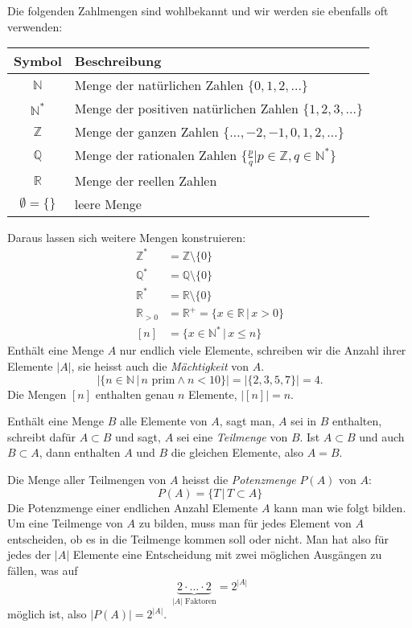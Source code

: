 Die folgenden Zahlmengen sind wohlbekannt und wir werden sie ebenfalls
oft verwenden:
\begin{center}
\begin{tabular}{|c|l|}
\hline
Symbol&Beschreibung\\
\hline
\index{natürliche Zahlen}%
$\mathbb N$&Menge der natürlichen Zahlen $\{0,1,2,\dots\}$\\
$\mathbb N^*$&Menge der positiven natürlichen Zahlen $\{1,2,3,\dots\}$\\
\index{ganze Zahlen}%
$\mathbb Z$&Menge der ganzen Zahlen $\{\dots,-2,-1,0,1,2,\dots\}$\\
\index{rationale Zahlen}%
$\mathbb Q$&Menge der rationalen Zahlen $\{\frac{p}{q}|p\in\mathbb Z,q\in\mathbb N^*\}$\\
\index{reelle Zahlen}%
$\mathbb R$&Menge der reellen Zahlen\\
\index{leere Menge}%
$\emptyset=\{\}$&leere Menge\\
\hline
\end{tabular}
\end{center}
Daraus lassen sich weitere Mengen konstruieren:
\begin{align*}
\mathbb Z^*&=\mathbb Z\setminus \{0\}\\
\mathbb Q^*&=\mathbb Q\setminus \{0\}\\
\mathbb R^*&=\mathbb R\setminus \{0\}\\
\mathbb R_{> 0}&=\mathbb R^+=\{x\in\mathbb R\,|\,x>0\}\\
[n]&=\{x\in \mathbb N^*\,|\,x\le n\}
\end{align*}
%
Enthält eine Menge $A$ nur endlich viele Elemente, schreiben wir die Anzahl
ihrer Elemente $|A|$, sie heisst auch die {\em Mächtigkeit} von $A$.
\[
|\{n\in\mathbb N\,|\,\text{$n$ prim}\wedge n<10\}|=|\{2,3,5,7\}|=4.
\]
Die Mengen $[n]$ enthalten genau $n$ Elemente, $|[n]|=n$.

Enthält eine Menge $B$ alle Elemente von $A$, sagt man, $A$ sei in $B$
enthalten, schreibt dafür $A\subset B$ und sagt, $A$ sei eine
{\em Teilmenge} von $B$. Ist $A\subset B$ und auch
$B\subset A$, dann enthalten $A$ und $B$ die gleichen Elemente, also
$A=B$.

%
Die Menge aller Teilmengen von $A$ heisst die {\em Potenzmenge} $P(A)$ von $A$:
\[
P(A)=\{ T\,|\,T\subset A\}
\]
Die Potenzmenge einer endlichen Anzahl Elemente $A$ kann man wie folgt bilden.
Um eine Teilmenge von $A$ zu bilden, muss man für jedes Element
von $A$ entscheiden, ob es in die Teilmenge kommen soll oder nicht.
Man hat also für jedes der $|A|$ Elemente eine Entscheidung mit zwei
möglichen Ausgängen zu fällen, was auf
\[
\underbrace{2\cdot\dots\cdot 2}_{\text{$|A|$ Faktoren}}=2^{|A|}
\]
möglich ist, also $|P(A)|=2^{|A|}$.

